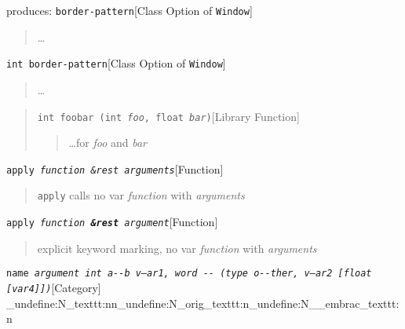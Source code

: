\documentclass{book}
\newcommand\GNUTexinfocommandstyletextvar[1]{{\normalfont{}\textsl{#1}}}%
\begin{document}
\noindent{}produces:
\noindent\texttt{border-pattern}\hfill[Class Option of \texttt{Window}]

%
\begin{quote}
\unskip{\parskip=0pt\noindent}%
\dots{}\@
\end{quote}

\noindent\texttt{\texttt{int} border-pattern}\hfill[Class Option of \texttt{Window}]

%
\begin{quote}
\unskip{\parskip=0pt\noindent}%
\dots{}\@
\end{quote}

\begin{quote}
\noindent\texttt{int foobar (int \GNUTexinfocommandstyletextvar{foo}, float \GNUTexinfocommandstyletextvar{bar})}\hfill[Library Function]

%
\begin{quote}
\unskip{\parskip=0pt\noindent}%
\dots{}\@ for \GNUTexinfocommandstyletextvar{foo} and \GNUTexinfocommandstyletextvar{bar}
\end{quote}
\end{quote}

\noindent\texttt{apply \EmbracOn{}\textnormal{\textsl{function \&rest arguments}}\EmbracOff{}}\hfill[Function]

%
\begin{quote}
\unskip{\parskip=0pt\noindent}%
\texttt{apply} calls no var \GNUTexinfocommandstyletextvar{function} with \GNUTexinfocommandstyletextvar{arguments}
\end{quote}

\noindent\texttt{apply \EmbracOn{}\textnormal{\textsl{function \EmbracOff{}\textnormal{\textbf{\&rest}}\EmbracOn{} argument}}\EmbracOff{}}\hfill[Function]

%
\begin{quote}
\unskip{\parskip=0pt\noindent}%
explicit keyword marking, no var \GNUTexinfocommandstyletextvar{function} with \GNUTexinfocommandstyletextvar{arguments}
\end{quote}

\noindent\texttt{name \EmbracOn{}\textnormal{\textsl{argument \texttt{int} \texttt{a{-}{-}b} \GNUTexinfocommandstyletextvar{v--ar1}, word \texttt{{-}{-}} (\texttt{type o{-}{-}ther}, \GNUTexinfocommandstyletextvar{v---ar2}  [\texttt{float} [\GNUTexinfocommandstyletextvar{var4}]])}}\EmbracOff{}}\hfill[Category]
\ExplSyntaxOn%
\cs_undefine:N{\embrac_texttt:nn}\cs_undefine:N{\embrac_orig_texttt:n}\cs_undefine:N{\__embrac_texttt:n}%
\ExplSyntaxOff%
\end{document}
